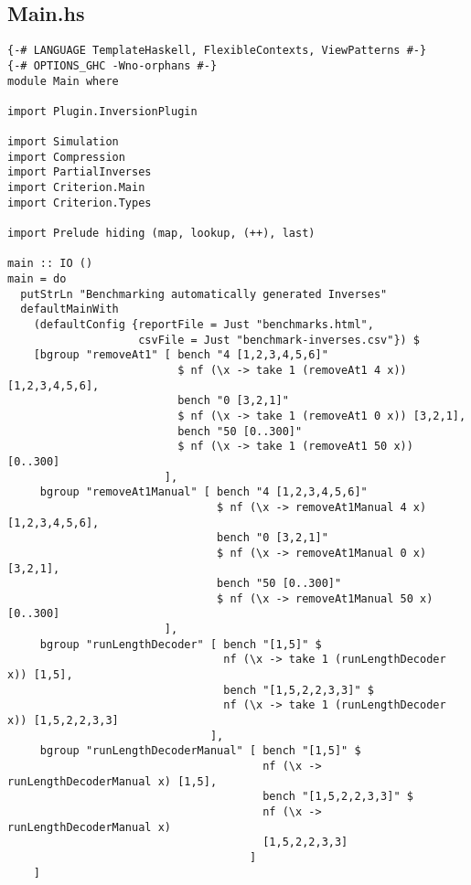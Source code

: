 
\vspace{0.3cm}
\vspace{0.3cm}

\subsection{Main.hs}
\label{A:main}

\begin{verbatim}
{-# LANGUAGE TemplateHaskell, FlexibleContexts, ViewPatterns #-}
{-# OPTIONS_GHC -Wno-orphans #-}
module Main where

import Plugin.InversionPlugin

import Simulation
import Compression
import PartialInverses
import Criterion.Main
import Criterion.Types

import Prelude hiding (map, lookup, (++), last)

main :: IO ()
main = do
  putStrLn "Benchmarking automatically generated Inverses"
  defaultMainWith
    (defaultConfig {reportFile = Just "benchmarks.html",
                    csvFile = Just "benchmark-inverses.csv"}) $
    [bgroup "removeAt1" [ bench "4 [1,2,3,4,5,6]"
                          $ nf (\x -> take 1 (removeAt1 4 x)) [1,2,3,4,5,6],
                          bench "0 [3,2,1]"
                          $ nf (\x -> take 1 (removeAt1 0 x)) [3,2,1],
                          bench "50 [0..300]"
                          $ nf (\x -> take 1 (removeAt1 50 x)) [0..300]
                        ],
     bgroup "removeAt1Manual" [ bench "4 [1,2,3,4,5,6]"
                                $ nf (\x -> removeAt1Manual 4 x) [1,2,3,4,5,6],
                                bench "0 [3,2,1]"
                                $ nf (\x -> removeAt1Manual 0 x) [3,2,1],
                                bench "50 [0..300]"
                                $ nf (\x -> removeAt1Manual 50 x) [0..300]
                        ],
     bgroup "runLengthDecoder" [ bench "[1,5]" $
                                 nf (\x -> take 1 (runLengthDecoder x)) [1,5],
                                 bench "[1,5,2,2,3,3]" $
                                 nf (\x -> take 1 (runLengthDecoder x)) [1,5,2,2,3,3]
                               ],
     bgroup "runLengthDecoderManual" [ bench "[1,5]" $
                                       nf (\x -> runLengthDecoderManual x) [1,5],
                                       bench "[1,5,2,2,3,3]" $
                                       nf (\x -> runLengthDecoderManual x)
                                       [1,5,2,2,3,3]
                                     ]
    ]



\end{verbatim}

